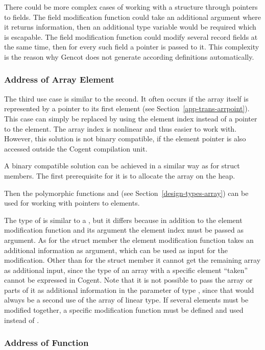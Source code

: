 There could be more complex cases of working with a structure through pointers to fields. The field modification function could
take an additional argument where it returns information, then an additional type variable  would be required
which is escapable. The field modification function could modify several record fields at the same time, then for every such field
a pointer is passed to it. This complexity is the reason why Gencot does not generate according definitions automatically.

\subsubsection{Address of Array Element}

The third use case is similar to the second. It often occurs if the array itself is represented by a pointer to its first
element (see Section~\ref{app-trans-arrpoint}). This case can simply be replaced by using the element index instead of a 
pointer to the element. The array index is nonlinear and thus easier to work with. However, this solution is not binary
compatible, if the element pointer is also accessed outside the Cogent compilation unit.

A binary compatible solution can be achieved in a similar way as for struct members. The first prerequisite for it is
to allocate the array on the heap.

Then the polymorphic functions  and  (see Section~\ref{design-types-array}) can be used
for working with pointers to elements.

The type of  is similar to a , but it differs because in addition to the element modification 
function and its argument the element index must be passed as argument.
As for the struct member the element modification function takes an additional information as argument, which can be
used as input for the modification. Other than for the struct member it cannot get the remaining array as additional input,
since the type of an array with a specific element ``taken'' cannot be expressed in Cogent. Note that it is not possible
to pass the array or parts of it as additional information in the parameter of type , since that would always be
a second use of the array of linear type. If several elements must be modified together, a specific modification function
must be defined and used instead of .

\subsubsection{Address of Function}

